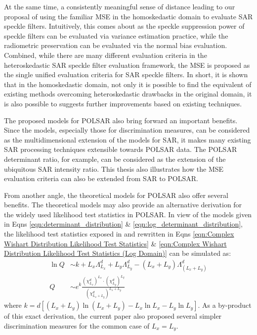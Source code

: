 At
                the same time, a consistently meaningful sense of
                distance leading to our proposal of using the familiar
                MSE in the homoskedastic domain to evaluate SAR speckle
                filters.
Intuitively,
                this comes about as the speckle suppression power of
                speckle filters can be evaluated via variance estimation
                practice, while the radiometric preservation can be
                evaluated via the normal bias evaluation.
Combined,
                while there are many different evaluation criteria in
                the heteroskedastic SAR speckle filter evaluation
                framework, the MSE is proposed as the single unified
                evaluation criteria for SAR speckle filters.
In
                short, it is shown that in the homoskedastic domain, not
                only it is possible to find the equivalent of existing
                methods overcoming heteroskedastic drawbacks in the
                original domain, it is also possible to suggests further
                improvements based on existing techniques.

The
                proposed models for POLSAR also bring forward an
                important benefits.
Since
                the models, especially those for discrimination
                measures, can be considered as the multidimensional
                extension of the models for SAR, it makes many existing
                SAR processing techniques extensible towards POLSAR
                data.
The POLSAR determinant ratio, for example, can be considered as
                the extension of the ubiquitous SAR intensity ratio.
This
                thesis also illustrates how the MSE evaluation
                criteria can also be extended from SAR to POLSAR.

From another angle, the theoretical models for POLSAR also offer several benefits.
The theoretical models may also provide an alternative derivation for the widely used likelihood test statistics in POLSAR.
In view of the models given in Eqns \ref{eqn:determinant_distribution} \& \ref{eqn:log_determinant_distribution},
  the likelihood test statistics exposed in \cite{Conradsen_2003_TGRS_4} and rewritten in Eqns \ref{eqn:Complex Wishart Distribution Likelihood Test Statistics} \& \ref{eqn:Complex Wishart Distribution Likelihood Test Statistics (Log Domain)}
can be simulated as:
\begin{align*}
  \ln{Q} &\sim  k + L_x \Lambda^d_{L_x} + L_y \Lambda^d_{L_y} - (L_x + L_y) \Lambda^d_{(L_x + L_y)} \\
  Q &\sim e^k \frac{(\chi^d_{L_x})^{L_x} \cdot (\chi^d_{L_y})^{L_y}}{(\chi^d_{L_x + L_y})^{L_x + L_y}}   
\end{align*}
where $k = d \left[ (L_x + L_y) \ln(L_x + L_y) - L_x \ln{L_x} - L_y \ln{L_y} \right]$.
As a by-product of this exact derivation, the current paper also proposed several simpler discrimination measures for the common case of $L_x=L_y$.

